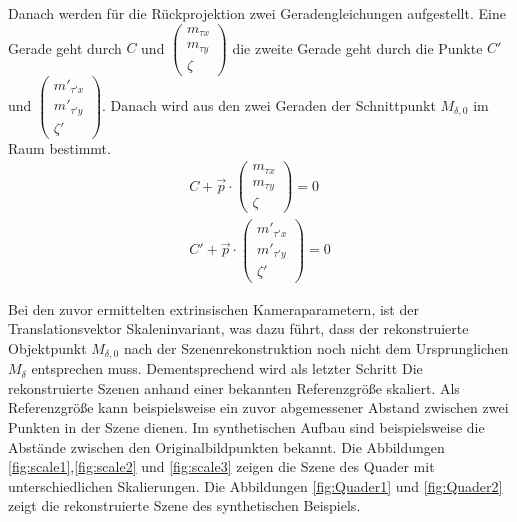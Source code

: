 Danach werden für die Rückprojektion zwei Geradengleichungen aufgestellt. Eine Gerade geht durch $C$ und $	\begin{pmatrix}
m_{\tau x} \\
m_{\tau y}\\
\zeta
\end{pmatrix} $ die zweite Gerade geht durch die Punkte $C'$ und $	\begin{pmatrix}
m'_{\tau' x} \\
m'_{\tau' y}\\
\zeta'
\end{pmatrix}$. Danach wird aus den zwei Geraden der Schnittpunkt $M_{\delta,0}$ im Raum bestimmt.\\


\begin{gather}
	 C +\vec{p} \cdot 
	\begin{pmatrix}
	m_{\tau x} \\
	m_{\tau y}\\
	\zeta
	\end{pmatrix} = 0\\
		C' +\vec{p} \cdot 
		\begin{pmatrix}
	m'_{\tau' x} \\
	m'_{\tau' y}\\
	\zeta'
	\end{pmatrix} = 0
\end{gather}


 
%

Bei den zuvor ermittelten extrinsischen Kameraparametern, ist der Translationsvektor Skaleninvariant, was dazu führt, dass der rekonstruierte Objektpunkt $M_{\delta,0}$ nach der Szenenrekonstruktion noch nicht dem Ursprunglichen $M_\delta$ entsprechen muss. Dementsprechend wird als letzter Schritt Die rekonstruierte Szenen anhand einer bekannten Referenzgröße skaliert. Als Referenzgröße kann beispielsweise ein zuvor abgemessener Abstand zwischen zwei Punkten in der Szene dienen. Im synthetischen Aufbau sind beispielsweise die Abstände zwischen den Originalbildpunkten bekannt. Die Abbildungen \ref{fig:scale1},\ref{fig:scale2} und \ref{fig:scale3} zeigen die Szene des Quader mit unterschiedlichen Skalierungen. Die Abbildungen \ref{fig:Quader1} und \ref{fig:Quader2} zeigt die rekonstruierte Szene des synthetischen Beispiels.


